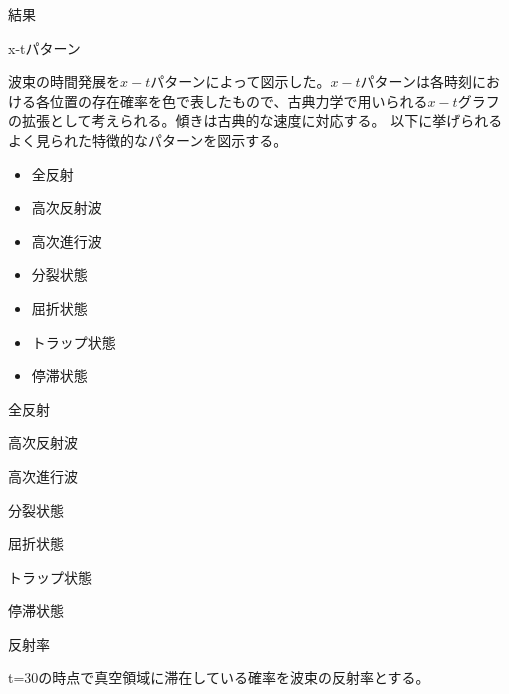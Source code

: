 \documentclass[a4paper, lualatex]{bxjsarticle}
\begin{document}
\begin{section}{結果}
    \begin{subsection}{x-tパターン}
        \par 波束の時間発展を$x-t$パターンによって図示した。$x-t$パターンは各時刻における各位置の存在確率を色で表したもので、古典力学で用いられる$x-t$グラフの拡張として考えられる。傾きは古典的な速度に対応する。
        以下に挙げられるよく見られた特徴的なパターンを図示する。
        \begin{itemize}
            \item 全反射
            \item 高次反射波
            \item 高次進行波
            \item 分裂状態
            \item 屈折状態
            \item トラップ状態
            \item 停滞状態
        \end{itemize}
    \end{subsection}
    \begin{subsection}{全反射}
        \par %
    \end{subsection}
    \begin{subsection}{高次反射波}
        \par %
    \end{subsection}
    \begin{subsection}{高次進行波}
        \par %
    \end{subsection}
    \begin{subsection}{分裂状態}
        \par %
    \end{subsection}
    \begin{subsection}{屈折状態}
        \par %
    \end{subsection}
    \begin{subsection}{トラップ状態}
        \par %
    \end{subsection}
    \begin{subsection}{停滞状態}
        \par %
    \end{subsection}
    \begin{subsection}{反射率}
        \par t=30の時点で真空領域に滞在している確率を波束の反射率とする。
    \end{subsection}
\end{section}
\end{document}
